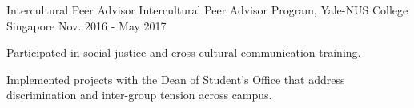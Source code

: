 \begin{cventries}
  \cventry
  {Intercultural Peer Advisor}
  {Intercultural Peer Advisor Program, Yale-NUS College}
  {Singapore}
  {Nov. 2016 - May 2017}
  {
    \begin{cvitems}
    \item {Participated in social justice and cross-cultural communication
        training.}
    \item {Implemented projects with the Dean of Student’s Office that address
        discrimination and inter-group tension across campus.}
    \end{cvitems}
  }

\end{cventries}
